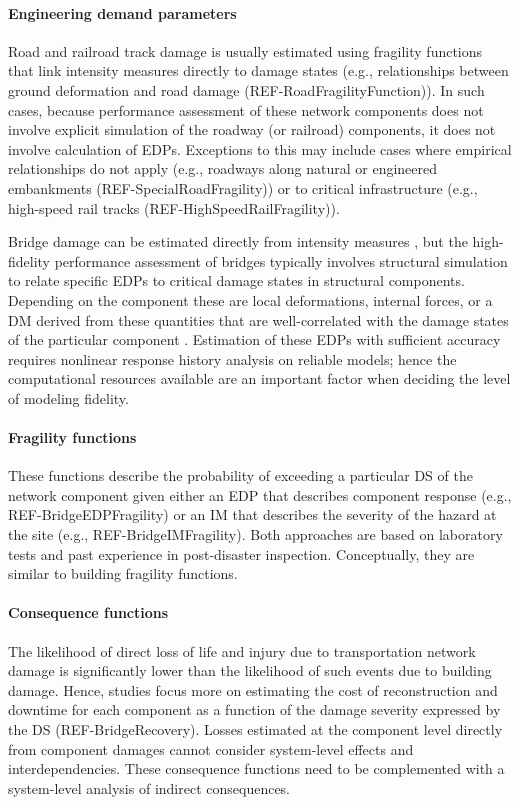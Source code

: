 \paragraph{Engineering demand parameters} Road and railroad track damage is usually estimated using fragility functions that link intensity measures directly to damage states (e.g., relationships between ground deformation and road damage (REF-RoadFragilityFunction)). In such cases, because performance assessment of these network components does not involve explicit simulation of the roadway (or railroad) components, it does not involve calculation of EDPs. Exceptions to this may include cases where empirical relationships do not apply (e.g., roadways along natural or engineered embankments (REF-SpecialRoadFragility)) or to critical infrastructure (e.g., high-speed rail tracks (REF-HighSpeedRailFragility)).

Bridge damage can be estimated directly from intensity measures \citep[e.g.,][]{division2018hazusa}, but the high-fidelity performance assessment of bridges typically involves structural simulation to relate specific EDPs to critical damage states in structural components. Depending on the component these are local deformations, internal forces, or a DM derived from these quantities \citep[e.g.,][]{park1985mechanistic} that are well-correlated with the damage states of the particular component \citep{choi2004seismic}. Estimation of these EDPs with sufficient accuracy requires nonlinear response history analysis on reliable models; hence the computational resources available are an important factor when deciding the level of modeling fidelity.

\paragraph{Fragility functions} These functions describe the probability of exceeding a particular DS of the network component given either an EDP that describes component response (e.g., REF-BridgeEDPFragility) or an IM that describes the severity of the hazard at the site (e.g., REF-BridgeIMFragility). Both approaches are based on laboratory tests and past experience in post-disaster inspection. Conceptually, they are similar to building fragility functions.

\paragraph{Consequence functions} The likelihood of direct loss of life and injury due to transportation network damage is significantly lower than the likelihood of such events due to building damage. Hence, studies focus more on estimating the cost of reconstruction and downtime for each component as a function of the damage severity expressed by the DS \citep{stergiou2006treatment} (REF-BridgeRecovery). Losses estimated at the component level directly from component damages cannot consider system-level effects and interdependencies. These consequence functions need to be complemented with a system-level analysis of indirect consequences.

